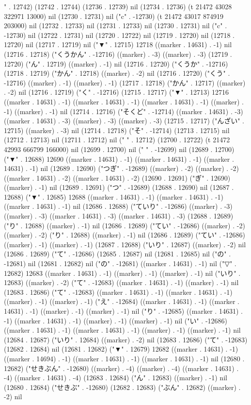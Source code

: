" . 12742) (12742 . 12744) (12736 . 12739) nil (12734 . 12736) (t 21472 43028 322971 13000) nil (12730 . 12731) nil ("c" . -12730) (t 21472 43017 874919 203000) nil (12732 . 12733) nil (12731 . 12733) nil (12730 . 12731) nil ("c" . -12730) nil (12722 . 12731) nil (12720 . 12722) nil (12719 . 12720) nil (12718 . 12720) nil (12717 . 12719) nil ("▼" . 12715) 12718 ((marker . 14631) . -1) nil (12716 . 12718) ("くうかん" . -12716) ((marker) . -3) ((marker) . -3) (12719 . 12720) ("ん" . 12719) ((marker) . -1) nil (12716 . 12720) ("くうか" . -12716) (12718 . 12719) ("かん" . 12718) ((marker) . -2) nil (12716 . 12720) ("くう" . -12716) ((marker) . -1) ((marker) . -1) (12717 . 12718) ("かん" . 12717) ((marker) . -2) nil (12716 . 12719) ("く" . -12716) (12715 . 12717) ("▼" . 12713) 12716 ((marker . 14631) . -1) ((marker . 14631) . -1) ((marker . 14631) . -1) ((marker) . -1) ((marker) . -1) nil (12714 . 12716) ("そくど" . -12714) ((marker . 14631) . -3) ((marker . 14631) . -3) ((marker) . -3) ((marker) . -3) (12715 . 12717) ("んざい" . 12715) ((marker) . -3) nil (12714 . 12718) ("そ" . -12714) (12713 . 12715) nil (12712 . 12713) nil (12711 . 12712) nil (" " . 12712) (12700 . 12722) (t 21472 42993 666799 166000) nil (12699 . 12700) nil (" " . -12699) nil (12689 . 12700) ("▼" . 12688) 12690 ((marker . 14631) . -1) ((marker . 14631) . -1) ((marker . 14631) . -1) nil (12689 . 12690) ("つぎ" . -12689) ((marker) . -2) ((marker) . -2) ((marker . 14631) . -2) ((marker . 14631) . -2) (12690 . 12691) ("ぎ" . 12690) ((marker) . -1) nil (12689 . 12691) ("つ" . -12689) (12688 . 12690) nil (12687 . 12688) ("▼" . 12685) 12688 ((marker . 14631) . -1) ((marker . 14631) . -1) ((marker . 14631) . -1) nil (12686 . 12688) ("ていり" . -12686) ((marker) . -3) ((marker) . -3) ((marker . 14631) . -3) ((marker . 14631) . -3) (12688 . 12689) ("り" . 12688) ((marker) . -1) nil (12686 . 12689) ("てい" . -12686) ((marker) . -2) ((marker) . -2) ("り" . 12688) ((marker) . -1) nil (12686 . 12689) ("てい" . -12686) ((marker) . -1) ((marker) . -1) (12687 . 12688) ("いり" . 12687) ((marker) . -2) nil (12686 . 12689) ("て" . -12686) (12685 . 12687) nil (12681 . 12685) nil ("の" . -12681) nil (12681 . 12682) nil ("の" . -12681) ((marker . 14631) . -1) nil ("▽" . 12682) 12683 ((marker . 14631) . -1) ((marker) . -1) ((marker) . -1) nil ("いり" . 12683) ((marker) . -2) ("て" . -12683) ((marker . 14631) . -1) ((marker) . -1) nil (12683 . 12686) ("て" . -12683) ((marker . 14631) . -1) ((marker . 14631) . -1) ((marker) . -1) ((marker) . -1) ("え" . -12684) ((marker . 14631) . -1) ((marker . 14631) . -1) ((marker) . -1) ((marker) . -1) nil ("り" . -12685) ((marker . 14631) . -1) ((marker . 14631) . -1) ((marker) . -1) ((marker) . -1) nil ("い" . -12686) ((marker . 14631) . -1) ((marker . 14631) . -1) ((marker) . -1) ((marker) . -1) nil (12684 . 12687) ("いり" . 12684) ((marker) . -2) nil (12683 . 12686) ("て" . -12683) (12682 . 12684) nil (12681 . 12682) ("▼" . 12679) 12682 ((marker . 14631) . -1) ((marker . 14694) . -1) ((marker . 14631) . -1) ((marker . 14631) . -1) nil (12680 . 12682) ("せきぶん" . -12680) ((marker) . -4) ((marker) . -4) ((marker . 14631) . -4) ((marker . 14631) . -4) (12683 . 12684) ("ん" . 12683) ((marker) . -1) nil (12680 . 12684) ("せきぶ" . -12680) (12682 . 12683) ("ぶん" . 12682) ((marker) . -2) nil 